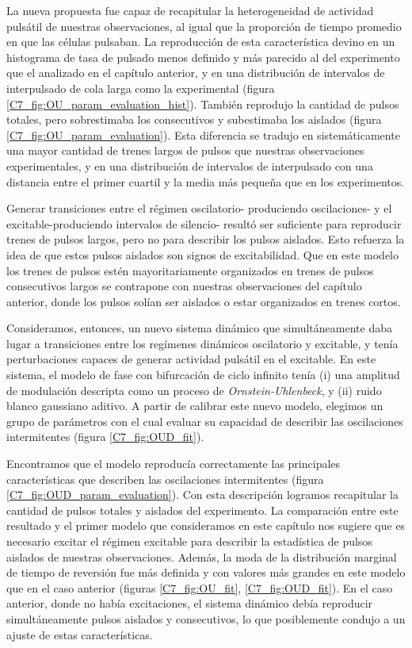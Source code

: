 \documentclass[./main.tex]{subfiles}
\begin{document}
La nueva propuesta fue capaz de recapitular la heterogeneidad de actividad pulsátil de nuestras observaciones, al igual que la proporción de tiempo promedio en que las células pulsaban. La reproducción de esta característica devino en un histograma de tasa de pulsado menos definido y más parecido al del experimento que el analizado en el capítulo anterior, y en una distribución de intervalos de interpulsado de cola larga como la experimental (figura \ref{C7_fig:OU_param_evaluation_hist}). También reprodujo la cantidad de pulsos totales, pero sobrestimaba los consecutivos y subestimaba los aislados (figura \ref{C7_fig:OU_param_evaluation}). Esta diferencia se tradujo en sistemáticamente una mayor cantidad de trenes largos de pulsos que nuestras observaciones experimentales, y en una distribución de intervalos de interpulsado con una distancia entre el primer cuartil y la media más pequeña que en los experimentos. 

Generar transiciones entre el régimen oscilatorio- produciendo oscilaciones- y el excitable-produciendo intervalos de silencio- resultó ser suficiente para reproducir trenes de pulsos largos, pero no para describir los pulsos aislados. Esto refuerza la idea de que estos pulsos aislados son signos de excitabilidad. Que en este modelo los trenes de pulsos estén mayoritariamente organizados en trenes de pulsos consecutivos largos se contrapone con nuestras observaciones del capítulo anterior, donde los pulsos solían ser aislados o estar organizados en trenes cortos. 

Consideramos, entonces, un nuevo sistema dinámico que simultáneamente daba lugar a transiciones entre los regímenes dinámicos oscilatorio y excitable, y tenía perturbaciones capaces de generar actividad pulsátil en el excitable. En este sistema, el modelo de fase con bifurcación de ciclo infinito tenía (i) una amplitud de modulación descripta como un proceso de \textit{Ornstein-Uhlenbeck}, y (ii) ruido blanco gaussiano aditivo. A partir de calibrar este nuevo modelo, elegimos un grupo de parámetros con el cual evaluar su capacidad de describir las oscilaciones intermitentes (figura \ref{C7_fig:OUD_fit}).

Encontramos que el modelo reproducía correctamente las principales características que describen las oscilaciones intermitentes (figura \ref{C7_fig:OUD_param_evaluation}). Con esta descripción logramos recapitular la cantidad de pulsos totales y aislados del experimento. La comparación entre este resultado y el primer modelo que consideramos en este capítulo nos sugiere que es necesario excitar el régimen excitable para describir la estadística de pulsos aislados de nuestras observaciones. Además, la moda de la distribución marginal de tiempo de reversión fue más definida y con valores más grandes en este modelo que en el caso anterior (figuras \ref{C7_fig:OU_fit}, \ref{C7_fig:OUD_fit}). En el caso anterior, donde no había excitaciones, el sistema dinámico debía reproducir simultáneamente pulsos aislados y consecutivos, lo que posiblemente condujo a un ajuste de estas características. 
\end{document}
